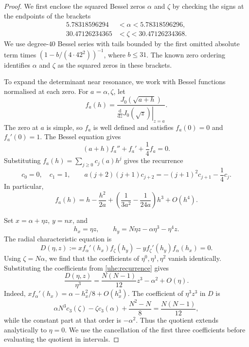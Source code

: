 \documentclass[a4paper,11pt]{amsart}
\numberwithin{equation}{section}
\theoremstyle{plain}
\theoremstyle{definition}
\begin{document}
\begin{proof}
We first enclose the squared Bessel zeros \(\alpha\) and \(\zeta\)
by checking the signs at the endpoints of the brackets
\[
 \begin{split}
 5.78318596294&<\alpha<5.78318596296,\\
 30.47126234365&<\zeta<30.47126234368.
 \end{split}
\]
We use degree-\(40\) Bessel series with tails bounded by the
first omitted absolute term times \((1-b/(4\cdot42^2))^{-1}\),
where \(b\le31\). The known zero ordering identifies \(\alpha\)
and \(\zeta\) as the squared zeros in these brackets.

To expand the determinant near resonance, we work with Bessel
functions normalised at each zero. For \(a=\alpha,\zeta\), let
\[
 f_a(h)=
 \frac{J_0(\sqrt{a+h})}
      {\left.\frac{\mathrm d}{\mathrm dz}J_0(\sqrt z)\right|_{z=a}}.
\]
The zero at \(a\) is simple, so \(f_a\) is well defined and
satisfies \(f_a(0)=0\) and \(f_a'(0)=1\). The Bessel equation gives
\[
 (a+h)f_a''+f_a'+\frac14f_a=0.
\]
Substituting \(f_a(h)=\sum_{j\ge0}c_j(a)h^j\) gives the recurrence
\[
 c_0=0,\quad c_1=1,\qquad
 a(j+2)(j+1)c_{j+2}
 =-(j+1)^2c_{j+1}-\frac14c_j.
 \tag{UHE1}\label{uhe:recurrence}
\]
In particular,
\[
 f_a(h)=h-\frac{h^2}{2a}
        +\left(\frac1{3a^2}-\frac1{24a}\right)h^3+O(h^4).
\]

Set \(x=\alpha+\eta z\), \(y=nx\), and
\[
 h_x=\eta z,\qquad
 h_y=N\eta z-\alpha\eta^3-\eta^4z.
\]
The radial characteristic equation is
\[
 D(\eta,z):=
 x f_\alpha'(h_x)f_\zeta(h_y)
 -y f_\zeta'(h_y)f_\alpha(h_x)=0.
\]
Using \(\zeta=N\alpha\), we find that the coefficients of
\(\eta^0,\eta^1,\eta^2\) vanish identically. Substituting the
coefficients from \eqref{uhe:recurrence} gives
\[
 \frac{D(\eta,z)}{\eta^3}
 =\frac{N(N-1)}{12}z^3-\alpha^2+O(\eta).
 \tag{UHE2}\label{uhe:normalised-D}
\]
Indeed, \(x f_\alpha'(h_x)=\alpha-h_x^2/8+O(h_x^3)\).
The coefficient of \(\eta^3z^3\) in \(D\) is
\[
 \alpha N^3c_3(\zeta)-\zeta c_3(\alpha)
       +\frac{N^2-N}{8}
 =\frac{N(N-1)}{12},
\]
while the constant part at that order is \(-\alpha^2\).
Thus the quotient extends analytically to \(\eta=0\). We use
the cancellation of the first three coefficients before evaluating
the quotient in intervals.


\end{proof}
\end{document}
